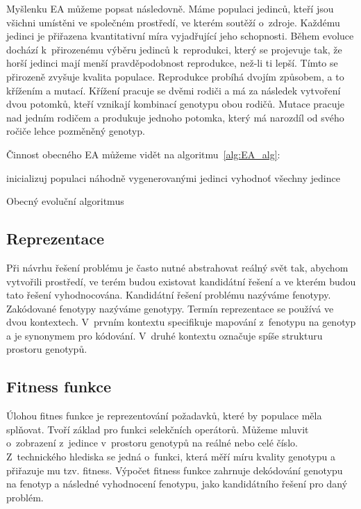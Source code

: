 Myšlenku EA můžeme popsat následovně.
Máme populaci jedinců, kteří jsou všichni umístěni ve společném prostředí, ve kterém soutěží o~zdroje.
Každému jedinci je přiřazena kvantitativní míra vyjadřující jeho schopnosti.
Během evoluce dochází k~přirozenému výběru jedinců k~reprodukci, který se projevuje tak, že horší jedinci mají menší pravděpodobnost reprodukce, než-li ti lepší.
Tímto se přirozeně zvyšuje kvalita populace.
Reprodukce probíhá dvojím způsobem, a to křížením a mutací.
Křížení pracuje se dvěmi rodiči a má za následek vytvoření dvou potomků, kteří vznikají kombinací genotypu obou rodičů.
Mutace pracuje nad jedním rodičem a produkuje jednoho potomka, který má narozdíl od svého ročiče lehce pozměněný genotyp.

Činnost obecného EA můžeme vidět na algoritmu~\ref{alg:EA_alg}:


\begin{algorithm}[H]
    inicializuj populaci náhodně vygenerovanými jedinci\;
    vyhodnoť všechny jedince\;
    \caption{Obecný evoluční algoritmus}
    \label{alg:EA_alg}
\end{algorithm}

\subsection{Reprezentace}
Při návrhu řešení problému je často nutné abstrahovat reálný svět tak, abychom vytvořili prostředí, ve terém budou existovat kandidátní řešení a ve kterém budou tato řešení vyhodnocována.
Kandidátní řešení problému nazýváme fenotypy.
Zakódované fenotypy nazýváme genotypy.
Termín reprezentace se používá ve dvou kontextech.
V~prvním kontextu specifikuje mapování z~fenotypu na genotyp a je synonymem pro kódování.
V~druhé kontextu označuje spíše strukturu prostoru genotypů.

\subsection{Fitness funkce}
Úlohou fitnes funkce je reprezentování požadavků, které by populace měla splňovat.
Tvoří základ pro funkci selekčních operátorů.
Můžeme mluvit o~zobrazení z~jedince v~prostoru genotypů na reálné nebo celé číslo.
Z~technického hlediska se jedná o~funkci, která měří míru kvality genotypu a přiřazuje mu tzv. fitness.
Výpočet fitness funkce zahrnuje dekódování genotypu na fenotyp a následné vyhodnocení fenotypu, jako kandidátního řešení pro daný problém.

